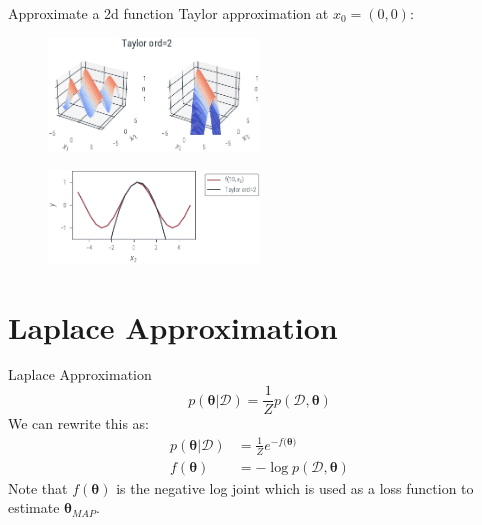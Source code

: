 \documentclass{beamer}
\begin{document}
\begin{frame}{Approximate a 2d function}
    Taylor approximation at $x_0 = (0, 0)$:
    \begin{figure}
        \includegraphics[width=0.5\textwidth]{../figures/laplace-approx/sin2d-taylor-2.pdf}
    \end{figure}
    \begin{figure}
        \includegraphics[width=0.5\textwidth]{../figures/laplace-approx/sin2d-taylor-1d-2.pdf}
    \end{figure}

\end{frame}

\section{Laplace Approximation}

\begin{frame}{Laplace Approximation}
    \begin{equation*}
        p(\boldsymbol{\theta}| \mathcal{D}) = \frac{1}{Z}p(\mathcal{D}, \boldsymbol{\theta})
    \end{equation*}
    \pause
    We can rewrite this as:
    \begin{align*}
        p(\boldsymbol{\theta}| \mathcal{D}) & = \frac{1}{Z}e^{-f(\boldsymbol{\theta)}}    \\
        f(\boldsymbol{\theta})              & = -\log p(\mathcal{D}, \boldsymbol{\theta})
    \end{align*}
    \pause
    Note that $f(\boldsymbol{\theta})$ is the negative log joint which is used as a loss function to estimate $\boldsymbol{\theta}_{MAP}$.
\end{frame}
\end{document}
